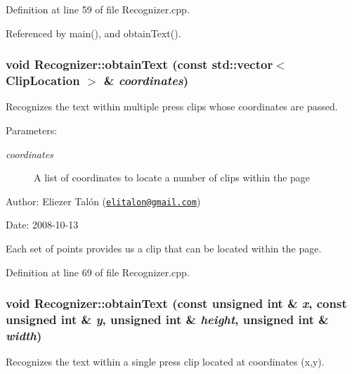 Definition at line 59 of file Recognizer.cpp.

Referenced by main(), and obtainText().\hypertarget{class_recognizer_4b3b27b3746edcf831d142eddfb81f19}{
\subsubsection[obtainText]{\setlength{\rightskip}{0pt plus 5cm}void Recognizer::obtainText (const std::vector$<$ {\bf ClipLocation} $>$ \& {\em coordinates})}}
\label{class_recognizer_4b3b27b3746edcf831d142eddfb81f19}


Recognizes the text within multiple press clips whose coordinates are passed. 

\begin{Desc}
\item[Parameters:]
\begin{description}
\item[{\em coordinates}]A list of coordinates to locate a number of clips within the page\end{description}
\end{Desc}
\begin{Desc}
\item[Author:]Eliezer Talón (\href{mailto:elitalon@gmail.com}{\tt elitalon@gmail.com}) \end{Desc}
\begin{Desc}
\item[Date:]2008-10-13\end{Desc}
Each set of points provides us a clip that can be located within the page. 

Definition at line 69 of file Recognizer.cpp.\hypertarget{class_recognizer_d117f344b1f77711e6cbab0f15dbc269}{
\subsubsection[obtainText]{\setlength{\rightskip}{0pt plus 5cm}void Recognizer::obtainText (const unsigned int \& {\em x}, \/  const unsigned int \& {\em y}, \/  unsigned int \& {\em height}, \/  unsigned int \& {\em width})}}
\label{class_recognizer_d117f344b1f77711e6cbab0f15dbc269}


Recognizes the text within a single press clip located at coordinates (x,y). 

